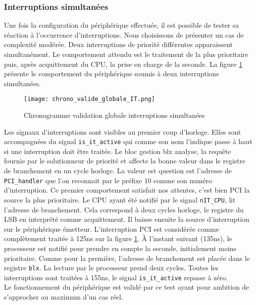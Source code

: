 \subsubsection{Interruptions simultanées}
Une fois la configuration du périphérique effectuée, il est possible de tester sa réaction à l'occurrence d'interruptions.
Nous choisissons de présenter un cas de complexité modérée.
Deux interruptions de priorité différentes apparaissent simultanément.
Le comportement attendu est le traitement de la plus prioritaire puis, après acquittement du CPU, la prise en charge de la seconde.
La figure \ref{fig:chrono_valide_globale_IT} présente le comportement du périphérique soumis à deux interruptions simultanées.
\begin{figure}[H]
    \centering
    \texttt{[image: chrono\_valide\_globale\_IT.png]}
    \caption{Chronogramme validation globale interruptions simultanées}
    \label{fig:chrono_valide_globale_IT}
\end{figure}
Les signaux d'interruptions sont visibles au premier coup d'horloge.
Elles sont accompagnées du signal \texttt{is\_it\_active} qui comme son nom l'indique passe à haut si une interruption doit être traitée.
Le bloc gestion blx analyse, la requête fournie par le solutionneur de priorité et affecte la bonne valeur dans le registre de branchement en un cycle horloge.
La valeur est question est l'adresse de \texttt{PCI\_handler} que l'on reconnait par le préfixe 10 comme son numéro d'interruption.
Ce premier comportement satisfait nos attentes, c'est bien PCI la source la plus prioritaire.
Le CPU ayant été notifié par le signal \texttt{nIT\_CPU}, lit l'adresse de branchement.
Cela correspond à deux cycles horloge, le registre du LSB en interprété comme acquittement.
Il baisse ensuite la source d'interruption sur le périphérique émetteur.
L'interruption PCI est considérée comme complètement traitée à 125ns sur la figure \ref{fig:chrono_valide_globale_IT}.
À l'instant suivant (135ns), le processeur est notifié pour prendre en compte la seconde, initialement moins prioritaire.
Comme pour la première, l'adresse de branchement est placée dans le registre \texttt{blx}.
La lecture par le processeur prend deux cycles.
Toutes les interruptions sont traitées à 155ns, le signal \texttt{is\_it\_active} repasse à zéro.\\

Le fonctionnement du périphérique est validé par ce test ayant pour ambition de s'approcher au maximum d'un cas réel.

